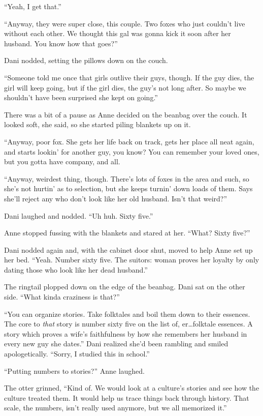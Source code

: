 ``Yeah, I get that.''

``Anyway, they were super close, this couple. Two foxes who just couldn't live without each other. We thought this gal was gonna kick it soon after her husband. You know how that goes?''

Dani nodded, setting the pillows down on the couch.

``Someone told me once that girls outlive their guys, though. If the guy dies, the girl will keep going, but if the girl dies, the guy's not long after. So maybe we shouldn't have been surprised she kept on going.''

There was a bit of a pause as Anne decided on the beanbag over the couch. It looked soft, she said, so she started piling blankets up on it.

``Anyway, poor fox. She gets her life back on track, gets her place all neat again, and starts lookin' for another guy, you know? You can remember your loved ones, but you gotta have company, and all.

``Anyway, weirdest thing, though. There's lots of foxes in the area and such, so she's not hurtin' as to selection, but she keeps turnin' down loads of them. Says she'll reject any who don't look like her old husband. Isn't that weird?''

Dani laughed and nodded. ``Uh huh. Sixty five.''

Anne stopped fussing with the blankets and stared at her. ``What? Sixty five?''

Dani nodded again and, with the cabinet door shut, moved to help Anne set up her bed. ``Yeah. Number sixty five. The suitors: woman proves her loyalty by only dating those who look like her dead husband.''

The ringtail plopped down on the edge of the beanbag. Dani sat on the other side. ``What kinda craziness is that?''

``You can organize stories. Take folktales and boil them down to their essences. The core to \emph{that} story is number sixty five on the list of, er\ldots{}folktale essences. A story which proves a wife's faithfulness by how she remembers her husband in every new guy she dates.'' Dani realized she'd been rambling and smiled apologetically. ``Sorry, I studied this in school.''

``Putting numbers to stories?'' Anne laughed.

The otter grinned, ``Kind of. We would look at a culture's stories and see how the culture treated them. It would help us trace things back through history. That scale, the numbers, isn't really used anymore, but we all memorized it.''

